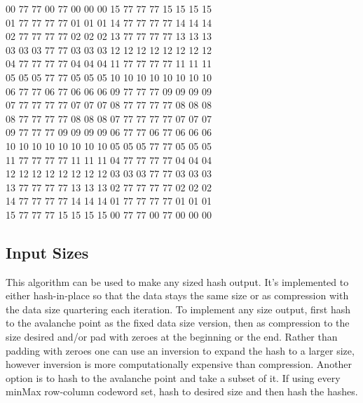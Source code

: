 \documentclass[11pt]{article}
\begin{document}
\begin{center}
00 77 77 00 77 00 00 00 15 77 77 77 15 15 15 15 \\
01 77 77 77 77 01 01 01 14 77 77 77 77 14 14 14 \\
02 77 77 77 77 02 02 02 13 77 77 77 77 13 13 13 \\
03 03 03 77 77 03 03 03 12 12 12 12 12 12 12 12 \\
04 77 77 77 77 04 04 04 11 77 77 77 77 11 11 11 \\
05 05 05 77 77 05 05 05 10 10 10 10 10 10 10 10 \\
06 77 77 06 77 06 06 06 09 77 77 77 09 09 09 09 \\
07 77 77 77 77 07 07 07 08 77 77 77 77 08 08 08 \\
08 77 77 77 77 08 08 08 07 77 77 77 77 07 07 07 \\
09 77 77 77 09 09 09 09 06 77 77 06 77 06 06 06 \\
10 10 10 10 10 10 10 10 05 05 05 77 77 05 05 05 \\
11 77 77 77 77 11 11 11 04 77 77 77 77 04 04 04 \\
12 12 12 12 12 12 12 12 03 03 03 77 77 03 03 03 \\
13 77 77 77 77 13 13 13 02 77 77 77 77 02 02 02 \\
14 77 77 77 77 14 14 14 01 77 77 77 77 01 01 01 \\
15 77 77 77 15 15 15 15 00 77 77 00 77 00 00 00 \\
\end{center}
\newpage
\subsection{Input Sizes}
This algorithm can be used to make any sized hash output. It's implemented to either hash-in-place so that the data stays the same size or as compression with the data size quartering each iteration. To implement any size output, first hash to the avalanche point as the fixed data size version, then as compression to the size desired and/or pad with zeroes at the beginning or the end. Rather than padding with zeroes one can use an inversion to expand the hash to a larger size, however inversion is more computationally expensive than compression. Another option is to hash to the avalanche point and take a subset of it. If using every minMax row-column codeword set, hash to desired size and then hash the hashes.\\
\end{document}
